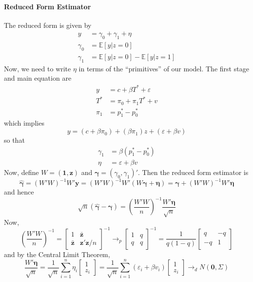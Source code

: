\documentclass[12pt]{article}
\begin{document}
\paragraph{Reduced Form Estimator}
The reduced form is given by
\begin{align*}
  y &= \gamma_0 + \gamma_1 + \eta \\
  \gamma_0 &= \mathbb{E}[y|z=0]\\
  \gamma_1 &= \mathbb{E}[y|z=0] - \mathbb{E}[y|z=1]
\end{align*}
Now, we need to write $\eta$ in terms of the ``primitives'' of our model.
The first stage and main equation are
\begin{align*}
  y &= c + \beta T^* + \varepsilon\\
  T^* &= \pi_0 + \pi_1 T^* + v\\
  \pi_1 &= p_1^* - p_0^*
\end{align*}
which implies
\[
  y = (c + \beta \pi_0) + (\beta \pi_1) z + (\varepsilon + \beta v)
\]
so that
\begin{align*}
\gamma_1 &= \beta(p_1^* - p_0^*)\\
\eta &= \varepsilon + \beta v
\end{align*}
Now, define $W = (\mathbf{1}, \mathbf{z})$ and $\boldsymbol{\gamma} = (\gamma_0, \gamma_1)'$.
Then the reduced form estimator is 
\[
  \widehat{\boldsymbol{\gamma}} = \left(W'W\right)^{-1}  W'\mathbf{y} 
  = \left( W'W \right)^{-1}W'\left( W\boldsymbol{\gamma} + \boldsymbol{\eta} \right) = \boldsymbol{\gamma} + \left( W'W \right)^{-1}W'\boldsymbol{\eta}
\]
and hence
\[
  \sqrt{n}\left( \widehat{\boldsymbol{\gamma}} - \boldsymbol{\gamma}\right) = \left( \frac{W'W}{n} \right)^{-1}\frac{W'\boldsymbol{\eta}}{\sqrt{n}}
\]
Now,
\[
  \left(\frac{W'W}{n}\right)^{-1} = \left[
  \begin{array}{cc}
    1 & \bar{\mathbf{z}} \\
    \bar{\mathbf{z}} & \mathbf{z}'\mathbf{z}/n
  \end{array}
\right]^{-1} \rightarrow_p 
\left[
\begin{array}{cc}
  1 & q \\
  q & q
\end{array}
\right]^{-1}
= \frac{1}{q(1-q)}\left[
\begin{array}{cc}
  q & -q \\
  -q & 1
\end{array}
\right]
\]
and by the Central Limit Theorem,
\[
  \frac{W'\boldsymbol{\eta}}{\sqrt{n}} = \frac{1}{\sqrt{n}}\sum_{i=1}^n \eta_i\left[
  \begin{array}{c}
    1 \\ z_i 
  \end{array}
\right] 
= \frac{1}{\sqrt{n}}\sum_{i=1}^n (\varepsilon_i + \beta v_i)\left[
  \begin{array}{c}
    1 \\ z_i 
  \end{array}
\right] \rightarrow_d N\left(\mathbf{0}, \Sigma \right)
\]
\end{document}
